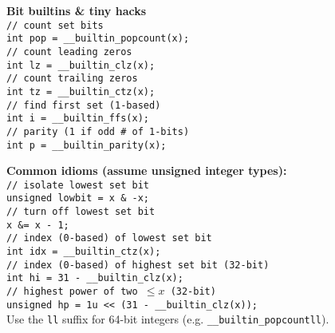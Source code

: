 \begin{center}
\small
\textbf{Bit builtins \& tiny hacks} \\
\texttt{// count set bits} \\
\texttt{int pop = \_\_builtin\_popcount(x);} \\
\texttt{// count leading zeros} \\
\texttt{int lz = \_\_builtin\_clz(x);} \\
\texttt{// count trailing zeros} \\
\texttt{int tz = \_\_builtin\_ctz(x);} \\
\texttt{// find first set (1-based)} \\
\texttt{int i = \_\_builtin\_ffs(x);} \\
\texttt{// parity (1 if odd \# of 1-bits)}  \\
\texttt{int p = \_\_builtin\_parity(x);}

\textbf{Common idioms (assume unsigned integer types):} \\[3pt]
\texttt{// isolate lowest set bit} \\ \texttt{unsigned lowbit = x \& -x;} \\[3pt]
\texttt{// turn off lowest set bit} \\ \texttt{x \&= x - 1;} \\[3pt]
\texttt{// index (0-based) of lowest set bit} \\ \texttt{int idx = \_\_builtin\_ctz(x);} \\[3pt]
\texttt{// index (0-based) of highest set bit (32-bit)} \\
\texttt{int hi = 31 - \_\_builtin\_clz(x);} \\[3pt]
\texttt{// highest power of two $\le x$ (32-bit)} \\
\texttt{unsigned hp = 1u << (31 - \_\_builtin\_clz(x));} \\[6pt]

Use the \texttt{ll} suffix for 64-bit integers (e.g. \texttt{\_\_builtin\_popcountll}).\\
\end{center}
